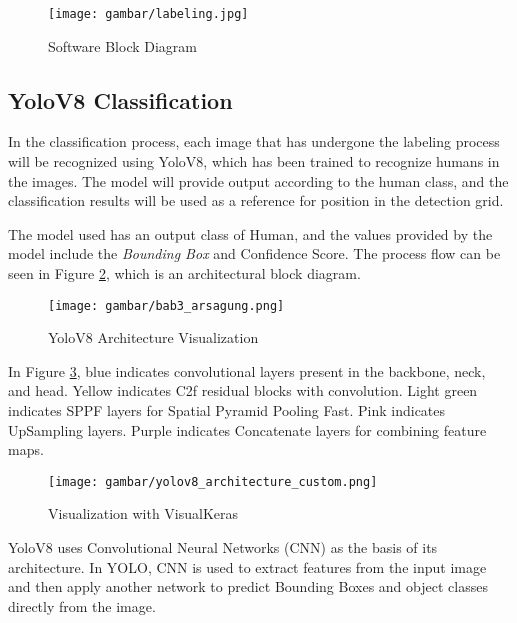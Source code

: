 \begin{figure}[H]
    \centering
    \texttt{[image: gambar/labeling.jpg]}
    \caption{Software Block Diagram}
    \label{fig:Software Block Diagram}
\end{figure}

\subsection{YoloV8 Classification}
In the classification process, each image that has undergone the labeling process will be recognized using YoloV8, which has been trained to recognize humans in the images. The model will provide output according to the human class, and the classification results will be used as a reference for position in the detection grid.

The model used has an output class of Human, and the values provided by the model include the \emph{Bounding Box} and Confidence Score. The process flow can be seen in Figure \ref{fig:YoloV8 Architecture Visualization}, which is an architectural block diagram.
\begin{figure}[H]
  \centering
  \texttt{[image: gambar/bab3\_arsagung.png]}
  \caption{YoloV8 Architecture Visualization}
  \label{fig:YoloV8 Architecture Visualization}
\end{figure}

In Figure \ref{fig:YoloV8 Architecture Visualization with VisualKeras}, blue indicates convolutional layers present in the backbone, neck, and head. Yellow indicates C2f residual blocks with convolution. Light green indicates SPPF layers for Spatial Pyramid Pooling Fast. Pink indicates UpSampling layers. Purple indicates Concatenate layers for combining feature maps.

\begin{figure}[H]
  \centering
  \texttt{[image: gambar/yolov8\_architecture\_custom.png]}
  \caption{Visualization with VisualKeras}
  \label{fig:YoloV8 Architecture Visualization with VisualKeras}
\end{figure}


\sloppy

YoloV8 uses Convolutional Neural Networks (CNN) as the basis of its architecture. In YOLO, CNN is used to extract features from the input image and then apply another network to predict Bounding Boxes and object classes directly from the image.

